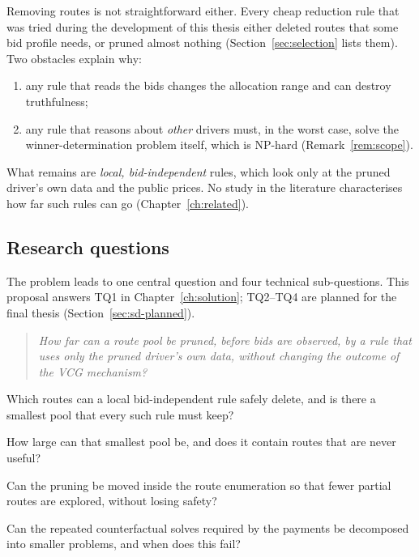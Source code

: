 Removing routes is not straightforward either. Every cheap reduction rule
that was tried during the development of this thesis either deleted routes
that some bid profile needs, or pruned almost nothing
(Section~\ref{sec:selection} lists them). Two obstacles explain why:
\begin{enumerate}[leftmargin=*,itemsep=2pt]
\item any rule that reads the bids changes the allocation range and can
destroy truthfulness;
\item any rule that reasons about \emph{other} drivers must, in the worst
case, solve the winner-determination problem itself, which is NP-hard
(Remark~\ref{rem:scope}).
\end{enumerate}
What remains are \emph{local, bid-independent} rules, which look only at
the pruned driver's own data and the public prices. No study in the
literature characterises how far such rules can go
(Chapter~\ref{ch:related}).

\subsection{Research questions}

The problem leads to one central question and four technical
sub-questions. This proposal answers TQ1 in Chapter~\ref{ch:solution};
TQ2--TQ4 are planned for the final thesis (Section~\ref{sec:sd-planned}).

\begin{quote}
\emph{How far can a route pool be pruned, before bids are observed, by a rule
that uses only the pruned driver's own data, without changing the outcome of
the VCG mechanism?}
\end{quote}

\begin{description}[leftmargin=1.2cm,style=nextline,itemsep=2pt]
\item[TQ1] Which routes can a local bid-independent rule safely delete, and
is there a smallest pool that every such rule must keep?
\item[TQ2] How large can that smallest pool be, and does it contain routes
that are never useful?
\item[TQ3] Can the pruning be moved inside the route enumeration so that
fewer partial routes are explored, without losing safety?
\item[TQ4] Can the repeated counterfactual solves required by the payments be
decomposed into smaller problems, and when does this fail?
\end{description}

